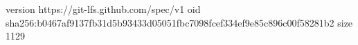 version https://git-lfs.github.com/spec/v1
oid sha256:b0467af9137fb31d5b93433d05051fbc7098fcef334ef9e85c896c00f58281b2
size 1129
